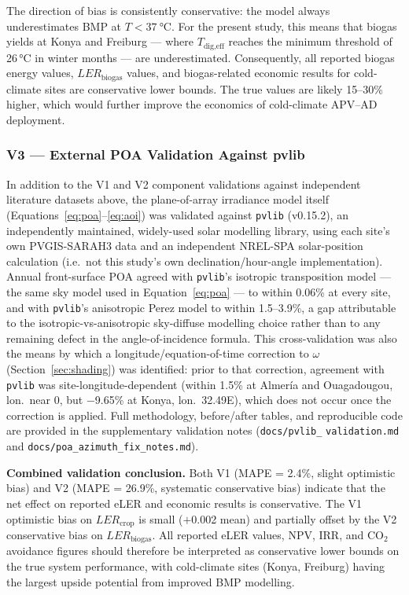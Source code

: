 The direction of bias is consistently conservative: the model
always underestimates BMP at $T < \SI{37}{\celsius}$. For the
present study, this means that biogas yields at Konya and Freiburg
--- where $T_{\text{dig,eff}}$ reaches the minimum threshold of
26\,\si{\celsius} in winter months --- are underestimated.
Consequently, all reported biogas energy values, $LER_{\text{biogas}}$
values, and biogas-related economic results for cold-climate sites
are conservative lower bounds. The true values are likely
15--30\% higher, which would further improve the economics of
cold-climate APV--AD deployment.

\subsubsection{V3 --- External POA Validation Against pvlib}

\hspace{1cm}In addition to the V1 and V2 component validations
against independent literature datasets above, the plane-of-array
irradiance model itself (Equations~\ref{eq:poa}--\ref{eq:aoi}) was
validated against \texttt{pvlib} (v0.15.2), an independently
maintained, widely-used solar modelling library, using each site's
own PVGIS-SARAH3 data and an independent NREL-SPA solar-position
calculation (i.e.\ not this study's own declination/hour-angle
implementation). Annual front-surface POA agreed with
\texttt{pvlib}'s isotropic transposition model --- the same sky
model used in Equation~\ref{eq:poa} --- to within 0.06\% at every
site, and with \texttt{pvlib}'s anisotropic Perez model to within
1.5--3.9\%, a gap attributable to the isotropic-vs-anisotropic
sky-diffuse modelling choice rather than to any remaining defect in
the angle-of-incidence formula. This cross-validation was also the
means by which a longitude/equation-of-time correction to
$\omega$ (Section~\ref{sec:shading}) was identified: prior to that
correction, agreement with \texttt{pvlib} was site-longitude-dependent
(within 1.5\% at Almer\'{i}a and Ouagadougou, lon.\ near
0\textdegree, but $-$9.65\% at Konya, lon.\ 32.49\textdegree E),
which does not occur once the correction is applied. Full
methodology, before/after tables, and reproducible code are provided
in the supplementary validation notes (\texttt{docs/pvlib\_}
\texttt{validation.md} and \texttt{docs/poa\_azimuth\_fix\_notes.md}).

\textbf{Combined validation conclusion.} Both V1 (MAPE = 2.4\%,
slight optimistic bias) and V2 (MAPE = 26.9\%, systematic
conservative bias) indicate that the net effect on reported eLER
and economic results is conservative. The V1 optimistic bias on
$LER_{\text{crop}}$ is small ($+$0.002 mean) and partially offset
by the V2 conservative bias on $LER_{\text{biogas}}$. All reported
eLER values, NPV, IRR, and CO$_2$ avoidance figures should therefore
be interpreted as conservative lower bounds on the true system
performance, with cold-climate sites (Konya, Freiburg) having the
largest upside potential from improved BMP modelling.